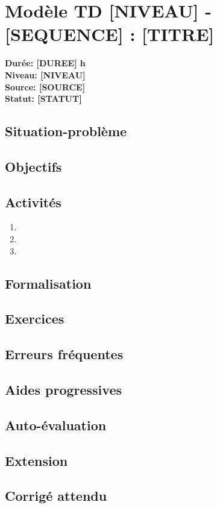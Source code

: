 \documentclass[a4paper,11pt]{article}
\begin{document}
\section*{Modèle TD [NIVEAU] - [SEQUENCE] : [TITRE]}
\textbf{Durée: [DUREE] h}\\
\textbf{Niveau: [NIVEAU]}\\
\textbf{Source: [SOURCE]}\\
\textbf{Statut: [STATUT]}

\subsection*{Situation-problème}

\subsection*{Objectifs}

\subsection*{Activités}
\begin{enumerate}
  \item
  \item
  \item
\end{enumerate}

\subsection*{Formalisation}

\subsection*{Exercices}

\subsection*{Erreurs fréquentes}

\subsection*{Aides progressives}

\subsection*{Auto-évaluation}

\subsection*{Extension}

\subsection*{Corrigé attendu}
\end{document}
